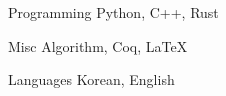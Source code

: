 

\begin{cvskills}




  \cvskill
    {Programming} %
    {Python, C++, Rust} %

  \cvskill
    {Misc} %
    {Algorithm, Coq, LaTeX} %

  \cvskill
    {Languages} %
    {Korean, English} %

\end{cvskills}

